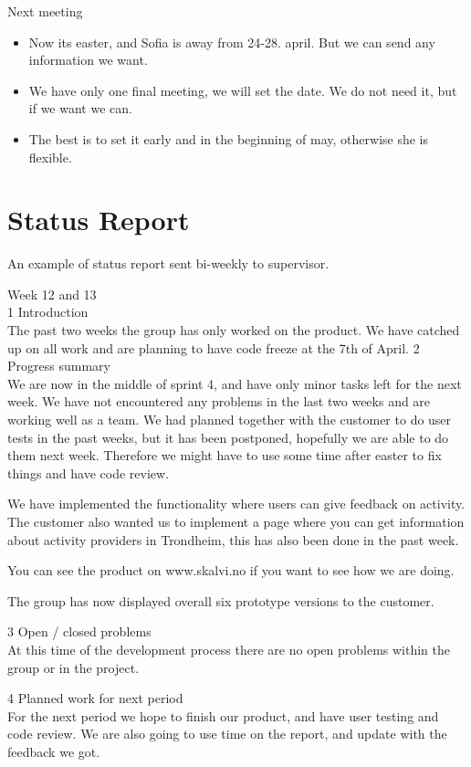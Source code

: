 {\large{Next meeting}}
\begin{itemize}  
    \item Now its easter, and Sofia is away from 24-28. april. But we can send any information we want. 
    \item We have only one final meeting, we will set the date. We do not need it, but if we want we can. 
    \item The best is to set it early and in the beginning of may, otherwise she is flexible. 
\end{itemize}


\section{Status Report}
\label{status_report}

An example of status report sent bi-weekly to supervisor.

{\Large{Week 12 and 13}}\\

{\large{1 Introduction}}\\
The past two weeks the group has only worked on the product. We have catched up on all work and are planning to have code freeze at the 7th of April.			
{\large{2 Progress summary}}\\					
We are now in the middle of sprint 4, and have only minor tasks left for the next week. We have not encountered any problems in the last two weeks and are working well as a team.  We had planned together with the customer to do user tests in the past weeks, but it has been postponed, hopefully we are able to do them next week. Therefore we might have to use some time after easter to fix things and have code review. 

We have implemented the functionality where users can give feedback on activity. The customer also wanted us to implement a page where you can get information about activity providers in Trondheim, this has also been done in the past week.

You can see the product on www.skalvi.no if you want to see how we are doing. 

The group has now displayed overall six prototype versions to the customer. 

{\large{3 Open / closed problems}}\\
At this time of the development process there are no open problems within the group or in the project.

{\large{4 Planned work for next period}}\\
For the next period we hope to finish our product, and have user testing and code review. We are also going to use time on the report, and update with the feedback we got.

